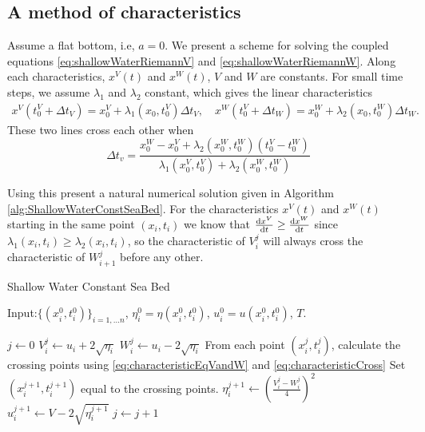 \documentclass[11pt]{article}
\begin{document}
\subsection{A method of characteristics}
Assume a flat bottom, i.e, $a = 0$. We present a scheme for solving the coupled equations \eqref{eq:shallowWaterRiemannV} and \eqref{eq:shallowWaterRiemannW}. Along each characteristics, $x^V(t)$ and $x^W(t)$, $V$ and $W$ are constants. For small time steps, we assume $\lambda_1$ and $\lambda_2$ constant, which gives the linear characteristics
\begin{align}
	\label{eq:characteristicEqVandW}
	x^V(t^V_0+\Delta t_V) = x^V_0 + \lambda_1(x_0,t^V_0)\Delta t_V ,\quad x^W(t^V_0+\Delta t_W) = x^W_0 + \lambda_2(x_0,t_0^W)\Delta t_W.
\end{align}
These two lines cross each other when 
\begin{equation}
	\label{eq:characteristicCross}
	\Delta t_v = \frac{x_0^W - x_0^V + \lambda_2(x_0^W,t_0^W)(t_0^V - t_0^W)}{\lambda_1(x_0^V,t_0^V)+\lambda_2(x_0^W,t_0^W)}
\end{equation}

Using this present a natural numerical solution given in  Algorithm \ref{alg:ShallowWaterConstSeaBed}.  
For the characteristics $x^V(t)$ and $x^W(t)$ starting in the same point $(x_i,t_i)$ we know that $\frac{\operatorname{d}\! x^V}{\operatorname{d}\! t}\geq \frac{\operatorname{d}\! x^W}{\operatorname{d}\! t}$ since $\lambda_1(x_i,t_i)\geq \lambda_2(x_i,t_i)$, so the characteristic of $V_i^j$ will always cross the characteristic of $W_{i+1}^j$ before any other. 
\begin{algorithm}
	\caption{Shallow Water Constant Sea Bed}
	\begin{algorithmic}[1]
		\State    Input:$\{(x^0_i,t^0_i)\}_{i=1,\ldots n}$, $\eta^0_i=\eta(x^0_i,t^0_i)$, $u^0_i = u(x_i^0,t^0_i)$,  $T$.

		\State $j\leftarrow 0$
		\State $V^j_i \leftarrow u_i + 2\sqrt{\eta_i}$
		\State $W^j_i \leftarrow u_i - 2\sqrt{\eta_i}$
		\State From each point $(x^j_i,t^j_i)$, calculate the crossing points using 		
		\eqref{eq:characteristicEqVandW} and \eqref{eq:characteristicCross}
		\State Set $(x^{j+1}_i,t^{j+1}_i)$ equal to the crossing points.
		\State $\eta_i^{j+1} \leftarrow \left(\frac{V_i^j -W_i^j}{4}\right)^2$
		\State $u_i^{j+1} \leftarrow V - 2\sqrt{\eta_i^{j+1}}$
		\State $j\leftarrow j + 1$
		\EndWhile
	\end{algorithmic}
	\label{alg:ShallowWaterConstSeaBed}
\end{algorithm}
%
%
\end{document}
